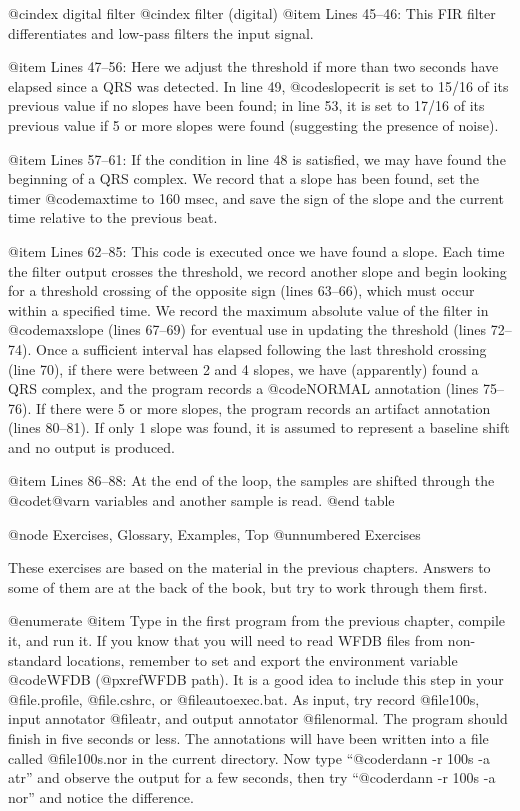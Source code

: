 {{{{{{{{{@cindex digital filter
@cindex filter (digital)
@item Lines 45--46:
This FIR filter differentiates and low-pass filters the input signal.

@item Lines 47--56:
Here we adjust the threshold if more than two seconds have elapsed since
a QRS was detected.  In line 49, @code{slopecrit} is set to 15/16 of its
previous value if no slopes have been found;  in line 53, it is set to
17/16 of its previous value if 5 or more slopes were found (suggesting
the presence of noise).

@item Lines 57--61:
If the condition in line 48 is satisfied, we may have found the beginning
of a QRS complex.  We record that a slope has been found, set the timer
@code{maxtime} to 160 msec, and save the sign of the slope and the current
time relative to the previous beat.

@item Lines 62--85:
This code is executed once we have found a slope.  Each time the filter
output crosses the threshold, we record another slope and begin looking
for a threshold crossing of the opposite sign (lines 63--66), which must
occur within a specified time.  We record the maximum absolute value of
the filter in @code{maxslope} (lines 67--69) for eventual use in updating
the threshold (lines 72--74).  Once a sufficient interval has elapsed
following the last threshold crossing (line 70), if there were between
2 and 4 slopes, we have (apparently) found a QRS complex, and the program
records a @code{NORMAL} annotation (lines 75--76).  If there were 5 or more
slopes, the program records an artifact annotation (lines 80--81).  If
only 1 slope was found, it is assumed to represent a baseline shift and
no output is produced.

@item Lines 86--88:
At the end of the loop, the samples are shifted through the @code{t@var{n}}
variables and another sample is read.
@end table

@node     Exercises, Glossary, Examples, Top
@unnumbered Exercises

These exercises are based on the material in the previous chapters.
Answers to some of them are at the back of the book, but try to work
through them first.

@enumerate
@item
Type in the first program from the previous chapter, compile it, and run
it.  If you know that you will need to read WFDB files from non-standard
locations, remember to set and export the environment variable @code{WFDB}
(@pxref{WFDB path}).  It is a good idea to include this step in your
@file{.profile}, @file{.cshrc}, or @file{autoexec.bat}.  As input, try
record @file{100s}, input annotator @file{atr}, and output annotator
@file{normal}.  The program should finish in five seconds or less.
The annotations will have been written into a file called
@file{100s.nor} in the current directory.  Now type
``@code{rdann -r 100s -a atr}'' and observe the output
for a few seconds, then try ``@code{rdann -r 100s -a nor}'' and notice the
difference.

}}}}}}}}}
